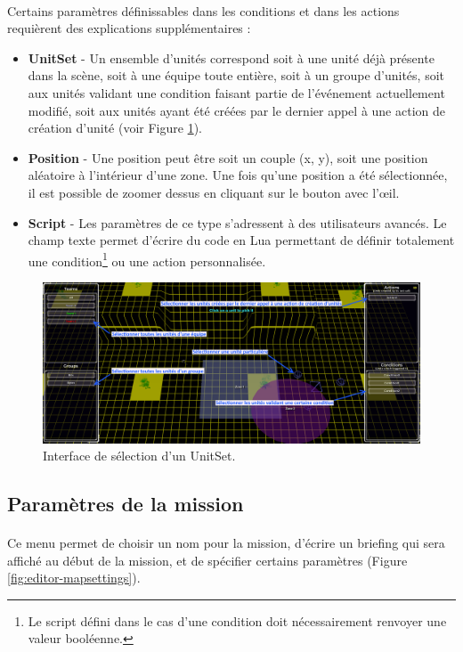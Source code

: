 \documentclass[a4paper]{article}
\begin{document}
\paragraph{ }
Certains paramètres définissables dans les conditions et dans les actions requièrent des explications supplémentaires :
\begin{itemize}
\item \textbf{UnitSet} - Un ensemble d'unités correspond soit à une unité déjà présente dans la scène, soit à une équipe toute entière, soit à un groupe d'unités, soit aux unités validant une condition faisant partie de l'événement actuellement modifié, soit aux unités ayant été créées par le dernier appel à une action de création d'unité (voir Figure \ref{fig:editor-pickunit}).
\item \textbf{Position} - Une position peut être soit un couple (x, y), soit une position aléatoire à l'intérieur d'une zone. Une fois qu'une position a été sélectionnée, il est possible de zoomer dessus en cliquant sur le bouton avec l'œil.
\item \textbf{Script} - Les paramètres de ce type s'adressent à des utilisateurs avancés. Le champ texte permet d'écrire du code en Lua permettant de définir totalement une condition\footnote{Le script défini dans le cas d'une condition doit nécessairement renvoyer une valeur booléenne.} ou une action personnalisée.
\end{itemize}
\begin{figure}[H]
\centering
\includegraphics[width=\linewidth]{editor-pickunit.png}
\caption{Interface de sélection d'un UnitSet.}
\label{fig:editor-pickunit}
\end{figure}
\subsection{Paramètres de la mission}\label{mapsettings}
\paragraph{ }
Ce menu permet de choisir un nom pour la mission, d'écrire un briefing qui sera affiché au début de la mission, et de spécifier certains paramètres (Figure \ref{fig:editor-mapsettings}).
\end{document}
